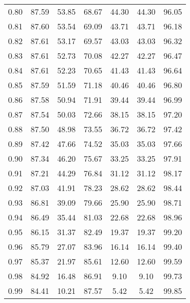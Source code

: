 \begin{tabular}{|c|c|c|c|c|c|c|}
      0.80 &     87.59 &     53.85 &      68.67 &   44.30 &      44.30 &         96.05 \\
      0.81 &     87.60 &     53.54 &      69.09 &   43.71 &      43.71 &         96.18 \\
      0.82 &     87.61 &     53.17 &      69.57 &   43.03 &      43.03 &         96.32 \\
      0.83 &     87.61 &     52.73 &      70.08 &   42.27 &      42.27 &         96.47 \\
      0.84 &     87.61 &     52.23 &      70.65 &   41.43 &      41.43 &         96.64 \\
      0.85 &     87.59 &     51.59 &      71.18 &   40.46 &      40.46 &         96.80 \\
      0.86 &     87.58 &     50.94 &      71.91 &   39.44 &      39.44 &         96.99 \\
      0.87 &     87.54 &     50.03 &      72.66 &   38.15 &      38.15 &         97.20 \\
      0.88 &     87.50 &     48.98 &      73.55 &   36.72 &      36.72 &         97.42 \\
      0.89 &     87.42 &     47.66 &      74.52 &   35.03 &      35.03 &         97.66 \\
      0.90 &     87.34 &     46.20 &      75.67 &   33.25 &      33.25 &         97.91 \\
      0.91 &     87.21 &     44.29 &      76.84 &   31.12 &      31.12 &         98.17 \\
      0.92 &     87.03 &     41.91 &      78.23 &   28.62 &      28.62 &         98.44 \\
      0.93 &     86.81 &     39.09 &      79.66 &   25.90 &      25.90 &         98.71 \\
      0.94 &     86.49 &     35.44 &      81.03 &   22.68 &      22.68 &         98.96 \\
      0.95 &     86.15 &     31.37 &      82.49 &   19.37 &      19.37 &         99.20 \\
      0.96 &     85.79 &     27.07 &      83.96 &   16.14 &      16.14 &         99.40 \\
      0.97 &     85.37 &     21.97 &      85.61 &   12.60 &      12.60 &         99.59 \\
      0.98 &     84.92 &     16.48 &      86.91 &    9.10 &       9.10 &         99.73 \\
      0.99 &     84.41 &     10.21 &      87.57 &    5.42 &       5.42 &         99.85 \\
\bottomrule
\end{tabular}
